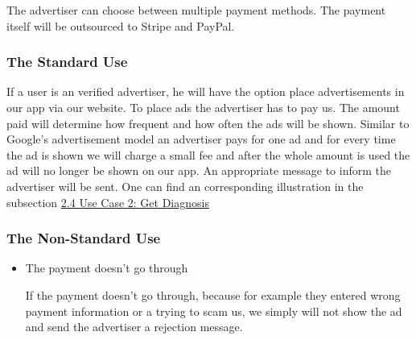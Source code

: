 The advertiser can choose between multiple payment methods. The payment itself will be outsourced to Stripe and PayPal.

\subsubsection{The Standard Use}

If a user is an verified advertiser, he will have the option place advertisements in our app via our website. To place ads the advertiser has to pay us. The amount paid will determine how frequent and how often the ads will be shown. Similar to Google's advertisement model an advertiser pays for one ad and for every time the ad is shown we will charge a small fee and after the whole amount is used the ad will no longer be shown on our app. An appropriate message to inform the advertiser will be sent. One can find an corresponding illustration in the subsection \hyperlink{AdIllustration}{2.4 Use Case 2: Get Diagnosis}



\subsubsection{The Non-Standard Use}

\begin{itemize}
    \item The payment doesn't go through
    
    If the payment doesn't go through, because for example they entered wrong payment information or a trying to scam us, we simply will not show the ad and send the advertiser a rejection message.
    
\end{itemize}

\pagebreak
